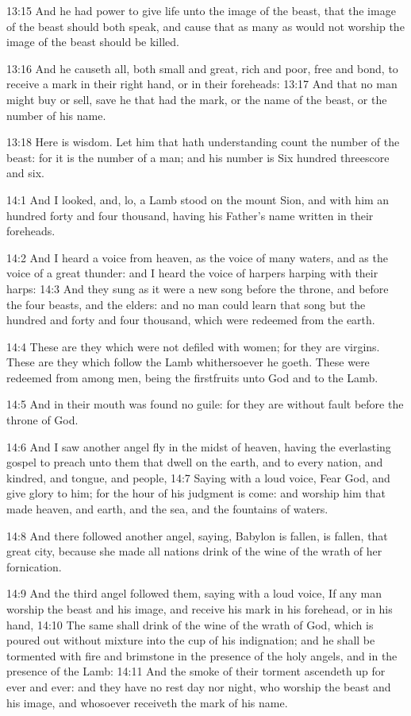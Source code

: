 13:15 And he had power to give life unto the image of the beast, that the image of the beast should both speak, and cause that as many as would not worship the image of the beast should be killed.

13:16 And he causeth all, both small and great, rich and poor, free and bond, to receive a mark in their right hand, or in their foreheads: 13:17 And that no man might buy or sell, save he that had the mark, or the name of the beast, or the number of his name.

13:18 Here is wisdom. Let him that hath understanding count the number of the beast: for it is the number of a man; and his number is Six hundred threescore and six.

14:1 And I looked, and, lo, a Lamb stood on the mount Sion, and with him an hundred forty and four thousand, having his Father's name written in their foreheads.

14:2 And I heard a voice from heaven, as the voice of many waters, and as the voice of a great thunder: and I heard the voice of harpers harping with their harps: 14:3 And they sung as it were a new song before the throne, and before the four beasts, and the elders: and no man could learn that song but the hundred and forty and four thousand, which were redeemed from the earth.

14:4 These are they which were not defiled with women; for they are virgins. These are they which follow the Lamb whithersoever he goeth.  These were redeemed from among men, being the firstfruits unto God and to the Lamb.

14:5 And in their mouth was found no guile: for they are without fault before the throne of God.

14:6 And I saw another angel fly in the midst of heaven, having the everlasting gospel to preach unto them that dwell on the earth, and to every nation, and kindred, and tongue, and people, 14:7 Saying with a loud voice, Fear God, and give glory to him; for the hour of his judgment is come: and worship him that made heaven, and earth, and the sea, and the fountains of waters.

14:8 And there followed another angel, saying, Babylon is fallen, is fallen, that great city, because she made all nations drink of the wine of the wrath of her fornication.

14:9 And the third angel followed them, saying with a loud voice, If any man worship the beast and his image, and receive his mark in his forehead, or in his hand, 14:10 The same shall drink of the wine of the wrath of God, which is poured out without mixture into the cup of his indignation; and he shall be tormented with fire and brimstone in the presence of the holy angels, and in the presence of the Lamb: 14:11 And the smoke of their torment ascendeth up for ever and ever: and they have no rest day nor night, who worship the beast and his image, and whosoever receiveth the mark of his name.

